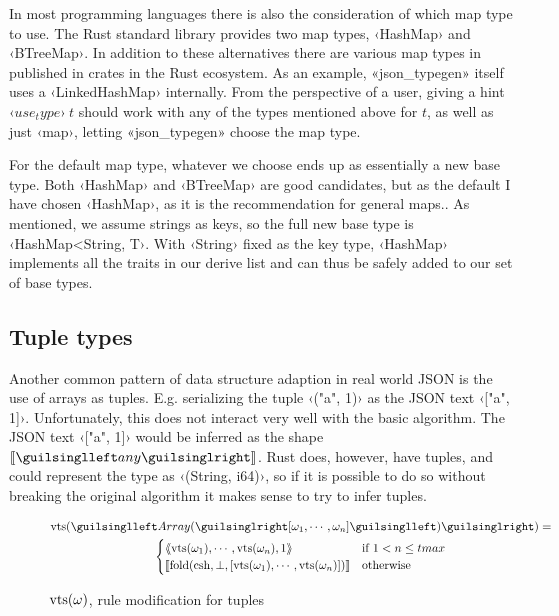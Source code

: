 In most programming languages there is also the consideration of which map type to use. The Rust standard library provides two map types, ‹HashMap› and ‹BTreeMap›. In addition to these alternatives there are various map types in published in crates in the Rust ecosystem. As an example, «json_typegen» itself uses a ‹LinkedHashMap› internally. From the perspective of a user, giving a hint $‹use_type›\ t$ should work with any of the types mentioned above for $t$, as well as just ‹map›, letting «json_typegen» choose the map type.

For the default map type, whatever we choose ends up as essentially a new base type. Both ‹HashMap› and ‹BTreeMap› are good candidates, but as the default I have chosen ‹HashMap›, as it is the recommendation for general maps.\cite[std::collections]{rust-std-docs}. As mentioned, we assume strings as keys, so the full new base type is ‹HashMap<String, T›. With ‹String› fixed as the key type, ‹HashMap› implements all the traits in our derive list and can thus be safely added to our set of base types.



\subsection{Tuple types}
\label{sec:ext-tuples}

Another common pattern of data structure adaption in real world JSON is the use of arrays as tuples. E.g. serializing the tuple ‹("a", 1)› as the JSON text ‹["a", 1]›. Unfortunately, this does not interact very well with the basic algorithm. The JSON text ‹["a", 1]› would be inferred as the shape $\vect{‹any›}$. Rust does, however, have tuples, and could represent the type as ‹(String, i64)›, so if it is possible to do so without breaking the original algorithm it makes sense to try to infer tuples.

\begin{figure}[ht!]
\begin{gather*}
\shap(‹Array(›[\omega_1, \cdots, \omega_n]‹)›) = \\ \begin{cases}
  \tupl{ \shap(\omega_1), \cdots, \shap(\omega_n), 1 }   &  \text{if } 1 < n \leq tmax \\
  \vect{ \fold(\csh, \bot, [\shap(\omega_1), \cdots, \shap(\omega_n)]) } & \text{otherwise}
\end{cases}
\end{gather*}
\caption{$\operatorname{vts}(\omega)$, rule modification for tuples}
\label{fig:shap-tuple}
\end{figure}


